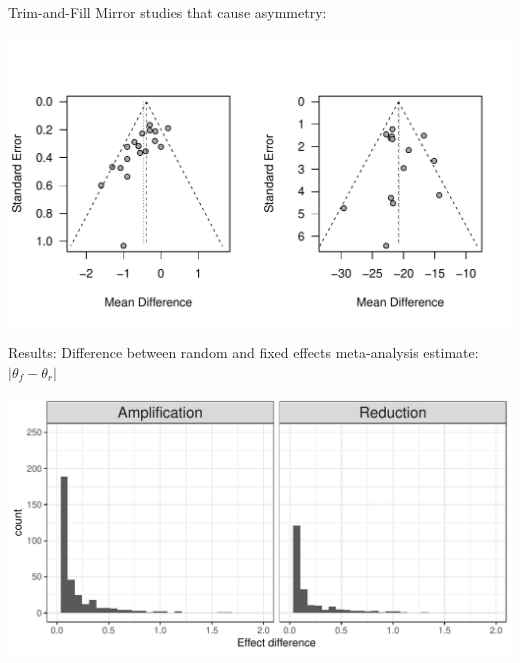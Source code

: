 \documentclass[english]{beamer}\usepackage[]{graphicx}\usepackage[]{color}
\makeatletter
\def\maxwidth{ %
  \ifdim\Gin@nat@width>\linewidth
    \linewidth
  \else
    \Gin@nat@width
  \fi
}
\newenvironment{knitrout}{}{} %
\makeatother
\begin{document}
\begin{frame}{Trim-and-Fill}
Mirror studies that cause asymmetry:
\vspace{-1.2cm}

\begin{knitrout}
\color{fgcolor}
\includegraphics[width=\maxwidth]{figure/unnamed-chunk-10-1} 

\end{knitrout}
\end{frame}


\begin{frame}[fragile]{Results:}
Difference between random and fixed effects meta-analysis estimate: $|\theta_f - \theta_{r}|$

\vspace{-3mm}
\begin{knitrout}
\color{fgcolor}
\includegraphics[width=\maxwidth]{figure/unnamed-chunk-11-1} 

\end{knitrout}
\end{frame}
\end{document}
